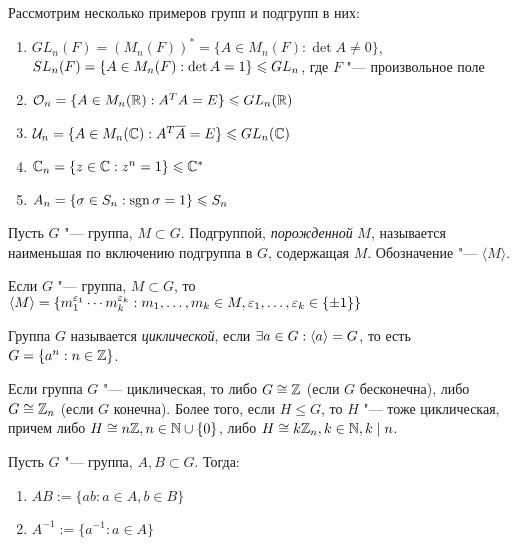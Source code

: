 \begin{example}
	Рассмотрим несколько примеров групп и подгрупп в них:
	\begin{enumerate}
		\item $GL_n(F) = (M_n(F))^* = \{A \in M_n(F): \det{A} \ne 0\}$, $SL_n(F) \hm= \{A \in M_n(F): \det{A} \hm= 1\} \le GL_n$, где $F$ "--- произвольное поле
		\item $\mathcal{O}_n = \{A \in M_n(\mathbb{R}): A^TA = E\} \leqslant GL_n(\mathbb{R})$
		\item $\mathcal{U}_n = \{A \in M_n(\mathbb{C}): A^T\overline{A} = E\} \leqslant GL_n(\mathbb{C})$
		\item $\mathbb{C}_n = \{z \in \mathbb{C}: z^n = 1\} \leqslant \mathbb{C}^*$
		\item $A_n = \{\sigma \in S_n: \operatorname{\mathop{sgn}}\sigma = 1\} \leqslant S_n$
	\end{enumerate}
\end{example}

\begin{definition}
	Пусть $G$ "--- группа, $M \subset G$. Подгруппой, \textit{порожденной} $M$, называется наименьшая по включению подгруппа в $G$, содержащая $M$. Обозначение "--- $\langle M\rangle$.
\end{definition}

\begin{reminder}
	Если $G$ "--- группа, $M \subset G$, то $\langle M\rangle = \{m_1^{\epsilon_1}\dotsm m_k^{\epsilon_k}: m_1, \dotsc, m_k \hm\in M, \epsilon_1, \dotsc, \epsilon_k \in \{\pm1\}\}$
\end{reminder}

\begin{definition}
	Группа $G$ называется \textit{циклической}, если $\exists a \hm\in G: \langle a\rangle = G$, то есть $G = \{a^n: n \in \mathbb{Z}\}$.
\end{definition}

\begin{reminder}
	Если группа $G$ "--- циклическая, то либо $G \cong \mathbb{Z}$ (если $G$ бесконечна), либо $G \cong \mathbb{Z}_n$ (если $G$ конечна). Более того, если $H \le G$, то $H$ "--- тоже циклическая, причем либо $H \cong n\mathbb{Z}, n \in \mathbb{N}\cup\{0\}$, либо $H \cong k\mathbb{Z}_n, k \in \mathbb{N}, k\mid n$.
\end{reminder}

\begin{definition}
	Пусть $G$ "--- группа, $A, B \subset G$. Тогда:
	\begin{enumerate}
		\item $AB := \{ab: a \in A, b \in B\}$
		\item $A^{-1} := \{a^{-1}: a \in A\}$
	\end{enumerate}
\end{definition}

